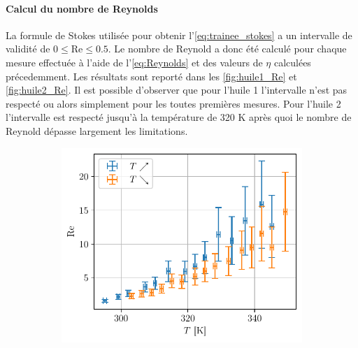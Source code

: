 \paragraph{Calcul du nombre de Reynolds}
La formule de Stokes utilisée pour obtenir l'\autoref{eq:trainee_stokes} a un intervalle de validité de $0 \leq \mathrm{Re} \leq 0.5$. Le nombre de Reynold a donc été calculé pour chaque mesure effectuée à l'aide de l'\autoref{eq:Reynolds} et des valeurs de $\eta$ calculées précedemment. Les résultats sont reporté dans les \autoref{fig:huile1_Re} et \autoref{fig:huile2_Re}. Il est possible d'observer que pour l'huile 1 l'intervalle n'est pas respecté ou alors simplement pour les toutes premières mesures. Pour l'huile 2 l'intervalle est respecté jusqu'à la température de 320 \si{\kelvin} après quoi le nombre de Reynold dépasse largement les limitations.
\begin{figure}[H]
    \centering
    \begin{subfigure}{0.48\linewidth}
        \centering
        \includegraphics[width=\linewidth]{figures/huile1_Re.pdf}
        \caption{}
        \label{fig:huile1_Re}
    \end{subfigure}
    \begin{subfigure}{0.48\linewidth}
        \centering

\end{subfigure}
\end{figure}
